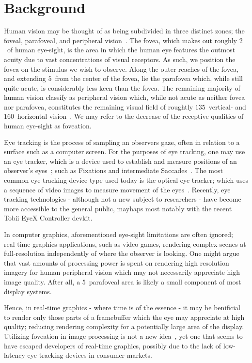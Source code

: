 \section{Background}
Human vision may be thought of as being subdivided in three distinct zones; the foveal, parafoveal, and peripheral vision~\cite{rayner98}.
The fovea, which makes out roughly $2$\degree\ of human eye-sight, is the area in which the human eye features the outmost acuity due to vast concentrations of visual receptors.
As such, we position the fovea on the stimulus we wish to observe.
Along the outer reaches of the fovea, and extending $5$\degree\ from the center of the fovea, lie the parafovea which, while still quite acute, is considerably less keen than the fovea.
The remaining majority of human vision classify as peripheral vision which, while not acute as neither fovea nor parafovea, constitutes the remaining visual field of roughtly $135$\degree\ vertical- and $160$\degree\ horizontal vision~\cite{guenter12}.
We may refer to the decrease of the receptive qualities of human eye-sight as foveation.

Eye tracking is the process of sampling an observers gaze, often in relation to a surface such as a computer screen.
For the purposes of eye tracking, one may use an eye tracker, which is a device used to establish and measure positions of an observer's eyes~\cite{duchowski07}; such as Fixations and intermediate Saccades~\cite{rayner98}.
The most common eye tracking device type used today is the optical eye tracker; which uses a sequence of video images to measure movement of the eyes~\cite{duchowski07}.
Recently, eye tracking technologies - although not a new subject to researchers - have become more accessible to the general public, mayhaps most notably with the recent Tobii EyeX Controller devkit.

In computer graphics, aforementioned eye-sight limitations are often ignored; real-time graphics applications, such as video games, rendering complex scenes at full-resolution independently of where the observer is looking.
One might argue that vast amounts of processing power is spent on rendering high resolution imagery for human peripheral vision which may not necessarily appreciate high image quality.
After all, a $5$\degree\ parafoveal area is likely a small component of most display systems.

Hence, in real-time graphics - where time is of the essence - it may be benificial to render only those parts of a framebuffer which the eye may appreciate at high quality; reducing rendering complexity for a potentially large area of the display.
Utilizing foveation in image processing is not a new idea~\cite{levoy90}, yet one that seems to have escaped developers of real-time graphics, possibly due to the lack of low-latency eye tracking devices in consumer markets.
